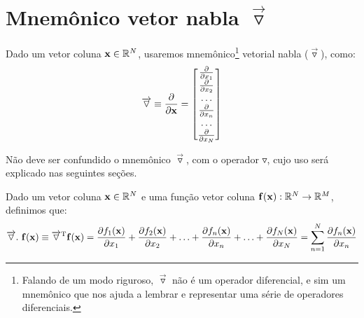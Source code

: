 \section{Mnemônico vetor nabla $\vec{\triangledown}$}

\begin{notation}
Dado um vetor coluna $\VECTOR{x}\in \mathbb{R}^N$, usaremos mnemônico\footnote{Falando de um modo riguroso, 
 $\overrightarrow{\triangledown}$ não é um operador diferencial, 
e sim um mnemônico que nos ajuda a lembrar e representar uma série de operadores diferenciais.} 
vetorial nabla ($\overrightarrow{\triangledown}$), como:
\begin{equation}
\overrightarrow{\triangledown}  \equiv \frac{\partial }{\partial \VECTOR{x}} =
\begin{bmatrix}
\frac{\partial  }{\partial x_{1}}\\
\frac{\partial  }{\partial x_{2}}\\
\hdots\\
\frac{\partial  }{\partial x_{n}}\\
\hdots\\
\frac{\partial  }{\partial x_{N}}
\end{bmatrix}
\end{equation}
\end{notation}

\begin{tcbattention}
Não deve ser confundido o mnemônico $\overrightarrow{\triangledown}$, 
com o operador $\triangledown$, cujo uso será explicado nas seguintes seções.
\end{tcbattention}

\begin{definition}
\label{def:nabla:dot}
Dado 
um vetor coluna $\VECTOR{x}\in \mathbb{R}^N$ e 
uma função vetor coluna $\VECTOR{f}(\VECTOR{x}): \mathbb{R}^N \rightarrow \mathbb{R}^M$, 
definimos que:
\begin{equation}
\overrightarrow{\triangledown}.~\VECTOR{f}(\VECTOR{x}) \equiv
\overrightarrow{\triangledown}^{\transpose}\VECTOR{f}(\VECTOR{x})= 
\frac{\partial f_{1}(\VECTOR{x}) }{\partial x_{1}}+
\frac{\partial f_{2}(\VECTOR{x}) }{\partial x_{2}}+
\hdots+
\frac{\partial f_{n}(\VECTOR{x}) }{\partial x_{n}}+
\hdots+
\frac{\partial f_{N}(\VECTOR{x}) }{\partial x_{N}}=
\sum \limits_{n=1}^N \frac{\partial f_{n}(\VECTOR{x}) }{\partial x_{n}}
\end{equation}

\end{definition}
